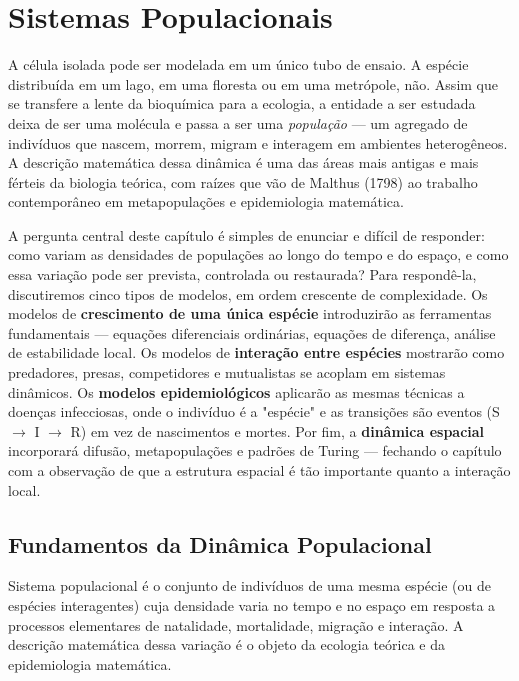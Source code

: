 
\chapter{Sistemas Populacionais}
\label{cap:10}

A célula isolada pode ser modelada em um único tubo de ensaio. A espécie
distribuída em um lago, em uma floresta ou em uma metrópole, não. Assim que se
transfere a lente da bioquímica para a ecologia, a entidade a ser estudada deixa
de ser uma molécula e passa a ser uma \emph{população} --- um agregado de
indivíduos que nascem, morrem, migram e interagem em ambientes heterogêneos. A
descrição matemática dessa dinâmica é uma das áreas mais antigas e mais
férteis da biologia teórica, com raízes que vão de Malthus (1798) ao trabalho
contemporâneo em metapopulações e epidemiologia matemática.

A pergunta central deste capítulo é simples de enunciar e difícil de responder:
como variam as densidades de populações ao longo do tempo e do espaço, e como
essa variação pode ser prevista, controlada ou restaurada? Para respondê-la,
discutiremos cinco tipos de modelos, em ordem crescente de complexidade. Os
modelos de \textbf{crescimento de uma única espécie} introduzirão as ferramentas
fundamentais --- equações diferenciais ordinárias, equações de diferença,
análise de estabilidade local. Os modelos de \textbf{interação entre espécies}
mostrarão como predadores, presas, competidores e mutualistas se acoplam em
sistemas dinâmicos. Os \textbf{modelos epidemiológicos} aplicarão as mesmas
técnicas a doenças infecciosas, onde o indivíduo é a "espécie" e as
transições são eventos (S $\to$ I $\to$ R) em vez de nascimentos e mortes. Por
fim, a \textbf{dinâmica espacial} incorporará difusão, metapopulações e padrões
de Turing --- fechando o capítulo com a observação de que a estrutura espacial
é tão importante quanto a interação local.

\section{Fundamentos da Dinâmica Populacional}
\label{sec:10-fundamentos}

\begin{definicaoenv}
Sistema populacional é o conjunto de indivíduos de uma mesma espécie (ou de
espécies interagentes) cuja densidade varia no tempo e no espaço em resposta a
processos elementares de natalidade, mortalidade, migração e interação. A
descrição matemática dessa variação é o objeto da ecologia teórica e da
epidemiologia matemática.
\end{definicaoenv}

